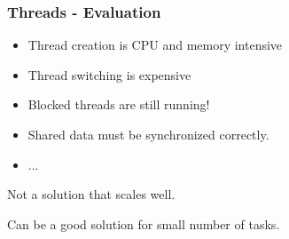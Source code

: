 \documentclass[aspectratio=169]{beamer}
\newif\iftransitions
\newcommand{\cpause}{\iftransitions \pause \fi}
\begin{document}
\begin{frame}
  \frametitle{Threads - Evaluation}

  \cpause
  \begin{itemize}
  \item Thread creation is CPU and memory intensive \cpause
  \item Thread switching is expensive \cpause
  \item Blocked threads are still running! \cpause
  \item Shared data must be synchronized correctly. \cpause
  \item ... \cpause
  \end{itemize}

  Not a solution that scales well.

  Can be a good solution for small number of tasks.
\end{frame}
\end{document}
